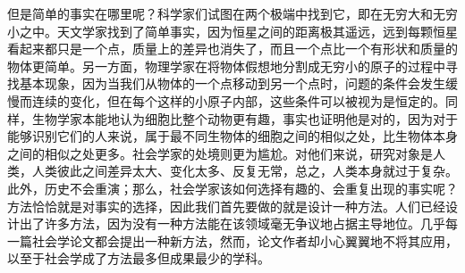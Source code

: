 \documentclass{article}
\begin{document}
但是简单的事实在哪里呢？科学家们试图在两个极端中找到它，即在无穷大和无穷小之中。天文学家找到了简单事实，因为恒星之间的距离极其遥远，远到每颗恒星看起来都只是一个点，质量上的差异也消失了，而且一个点比一个有形状和质量的物体更简单。另一方面，物理学家在将物体假想地分割成无穷小的原子的过程中寻找基本现象，因为当我们从物体的一个点移动到另一个点时，问题的条件会发生缓慢而连续的变化，但在每个这样的小原子内部，这些条件可以被视为是恒定的。同样，生物学家本能地认为细胞比整个动物更有趣，事实也证明他是对的，因为对于能够识别它们的人来说，属于最不同生物体的细胞之间的相似之处，比生物体本身之间的相似之处更多。社会学家的处境则更为尴尬。对他们来说，研究对象是人类，人类彼此之间差异太大、变化太多、反复无常，总之，人类本身就过于复杂。此外，历史不会重演；那么，社会学家该如何选择有趣的、会重复出现的事实呢？方法恰恰就是对事实的选择，因此我们首先要做的就是设计一种方法。人们已经设计出了许多方法，因为没有一种方法能在该领域毫无争议地占据主导地位。几乎每一篇社会学论文都会提出一种新方法，然而，论文作者却小心翼翼地不将其应用，以至于社会学成了方法最多但成果最少的学科。\\ 
\end{document}
